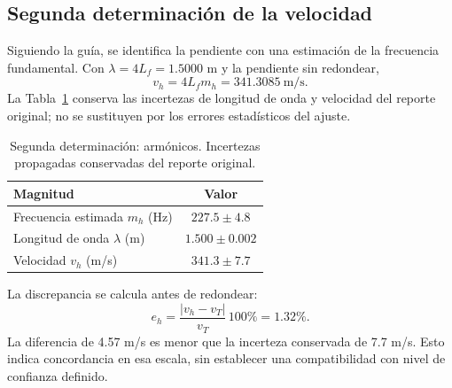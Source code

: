 \subsection{Segunda determinación de la velocidad}
Siguiendo la guía, se identifica la pendiente con una estimación de la frecuencia fundamental. Con $\lambda=4L_f=1.5000$ m y la pendiente sin redondear,
\begin{equation}
v_h=4L_fm_h=341.3085\ \mathrm{m/s}.
\label{eq:vh}
\end{equation}
La Tabla~\ref{tab:calculo_v} conserva las incertezas de longitud de onda y velocidad del reporte original; no se sustituyen por los errores estadísticos del ajuste.
\begin{table}[!t]
\centering
\caption{Segunda determinación: armónicos. Incertezas propagadas conservadas del reporte original.}
\label{tab:calculo_v}
\begin{tabular}{lc}
\toprule
Magnitud & Valor\\
\midrule
Frecuencia estimada $m_h$ (Hz) & $227.5\pm4.8$\\
Longitud de onda $\lambda$ (m) & $1.500\pm0.002$\\
Velocidad $v_h$ (m/s) & $341.3\pm7.7$\\
\bottomrule
\end{tabular}
\end{table}
La discrepancia se calcula antes de redondear:
\begin{equation}
e_h=\frac{|v_h-v_T|}{v_T}\,100\%=1.32\%.
\label{eq:error_armonicos}
\end{equation}
La diferencia de 4.57 m/s es menor que la incerteza conservada de 7.7 m/s. Esto indica concordancia en esa escala, sin establecer una compatibilidad con nivel de confianza definido.

